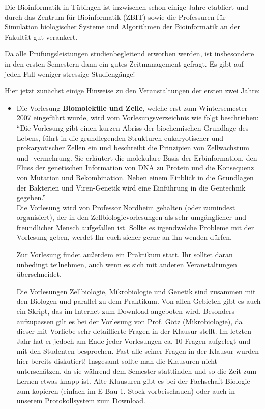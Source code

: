 
Die Bioinformatik in Tübingen ist inzwischen schon einige Jahre etabliert
und durch das Zentrum für Bioinformatik (ZBIT) sowie die Professuren für Simulation
biologischer Systeme und Algorithmen der Bioinformatik an der Fakultät gut verankert.

Da alle Prüfungsleistungen studienbegleitend erworben werden, ist insbesondere in den ersten Semestern dann ein gutes Zeitmanagement gefragt. Es gibt auf jeden Fall weniger stressige Studiengänge!

Hier jetzt zunächst einige Hinweise zu den Veranstaltungen der ersten zwei Jahre:

\begin{itemize}

\item Die Vorlesung \textbf{Biomoleküle und Zelle}, welche erst zum Wintersemester 2007 eingeführt wurde, wird vom Vorlesungsverzeichnis wie folgt beschrieben:\\
"`Die Vorlesung gibt einen kurzen Abriss der biochemischen Grundlage des Lebens, führt in die grundlegenden Strukturen eukaryotischer und prokaryotischer Zellen ein und
beschreibt die Prinzipien von Zellwachstum und -vermehrung. Sie erläutert die molekulare Basis der Erbinformation, den Fluss der genetischen Information von DNA zu Protein
und die Konsequenz von Mutation und Rekombination. Neben einem Einblick in die Grundlagen der Bakterien und Viren-Genetik wird eine Einführung in die Gentechnik gegeben."'\\
Die Vorlesung wird von Professor Nordheim gehalten (oder zumindest organisiert), der in den Zellbiologievorlesungen als sehr umgänglicher und freundlicher Mensch aufgefallen ist.
Sollte es irgendwelche Probleme mit der Vorlesung geben, werdet Ihr euch sicher gerne an ihn wenden dürfen.

Zur Vorlesung findet außerdem ein Praktikum statt. Ihr solltet daran unbedingt teilnehmen, auch wenn es sich mit anderen Veranstaltungen überschneidet.

     Die Vorlesungen Zellbiologie, Mikrobiologie und Genetik sind zusammen mit den Biologen und
     parallel zu dem Praktikum. Von allen Gebieten gibt es auch ein Skript, das im Internet zum Download angeboten wird.
     Besonders aufzupassen gilt es bei der Vorlesung von Prof. Götz (Mikrobiologie), da
     dieser mit Vorliebe sehr detaillierte Fragen in der Klausur stellt. Im letzten Jahr hat er jedoch
     am Ende jeder Vorlesungen ca. 10 Fragen aufgelegt und mit den Studenten besprochen.
     Fast alle seiner Fragen in der Klausur wurden hier bereits diskutiert!
     Insgesamt sollte man die Klausuren nicht unterschätzen, da sie während
     dem Semester stattfinden und so die Zeit zum Lernen etwas knapp ist. Alte Klausuren gibt es bei der
     Fachschaft Biologie zum kopieren (einfach im E-Bau 1. Stock vorbeischauen) oder auch in unserem Protokollsystem zum Download.


\end{itemize}
